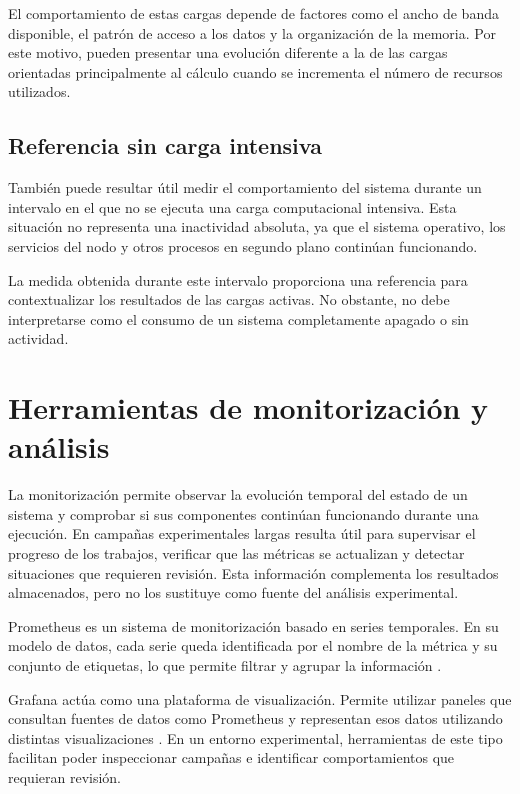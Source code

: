 El comportamiento de estas cargas depende de factores como el ancho de banda disponible, el patrón de acceso a los datos y la organización de la memoria. Por este motivo, pueden presentar una evolución diferente a la de las cargas orientadas principalmente al cálculo cuando se incrementa el número de recursos utilizados.

\subsection{Referencia sin carga intensiva}

También puede resultar útil medir el comportamiento del sistema durante un intervalo en el que no se ejecuta una carga computacional intensiva. Esta situación no representa una inactividad absoluta, ya que el sistema operativo, los servicios del nodo y otros procesos en segundo plano continúan funcionando.

La medida obtenida durante este intervalo proporciona una referencia para contextualizar los resultados de las cargas activas. No obstante, no debe interpretarse como el consumo de un sistema completamente apagado o sin actividad.

\section{Herramientas de monitorización y análisis}

La monitorización permite observar la evolución temporal del estado de un sistema y comprobar si sus componentes continúan funcionando durante una ejecución. En campañas experimentales largas resulta útil para supervisar el progreso de los trabajos, verificar que las métricas se actualizan y detectar situaciones que requieren revisión. Esta información complementa los resultados almacenados, pero no los sustituye como fuente del análisis experimental.

Prometheus es un sistema de monitorización basado en series temporales. En su modelo de datos, cada serie queda identificada por el nombre de la métrica y su conjunto de etiquetas, lo que permite filtrar y agrupar la información \parencite{prometheusDataModel}.

Grafana actúa como una plataforma de visualización. Permite utilizar paneles que consultan fuentes de datos como Prometheus y representan esos datos utilizando distintas visualizaciones \parencite{grafanaDashboards}. En un entorno experimental, herramientas de este tipo facilitan poder inspeccionar campañas e identificar comportamientos que requieran revisión.

